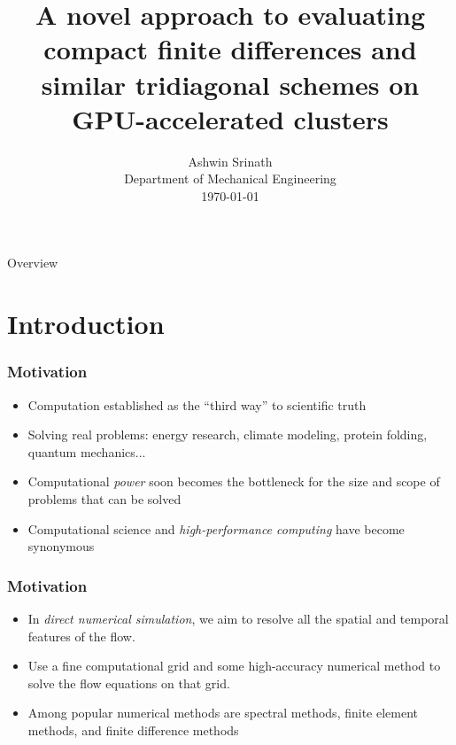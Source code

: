 \documentclass{beamer}
\begin{document}
\title[Compact finite differences on GPUs]
{A novel approach to evaluating 
compact finite differences 
and similar tridiagonal schemes on GPU-accelerated clusters}

\author[Ashwin Srinath]{
        Ashwin Srinath\\
        Department of Mechanical Engineering\\
        \today}
\date{}
\titlepage

\begin{frame}{Overview}
    \tableofcontents
\end{frame}

\section{Introduction}

\begin{frame}
\frametitle{Motivation}
\pause
\begin{itemize}[<+->]
    \item Computation established as the ``third way''
        to scientific truth
    \item Solving real problems:
        energy research,
        climate modeling,
        protein folding,
        quantum mechanics...
    \item Computational \emph{power} soon becomes
        the bottleneck for the size and scope of
        problems that can be solved
    \item Computational science and
        \emph{high-performance computing} have become
        synonymous
\end{itemize}
\end{frame}



\begin{frame}
\frametitle{Motivation}
\pause
\begin{itemize}[<+->]
    \item In \emph{direct numerical simulation},
        we aim to resolve all the spatial and temporal
        features of the flow.
    \item Use a fine computational grid
        and some high-accuracy numerical method to
        solve the flow equations on that grid.
    \item Among popular numerical methods
        are spectral methods, finite element methods,
        and finite difference methods
\end{itemize}
\end{frame}
\end{document}
